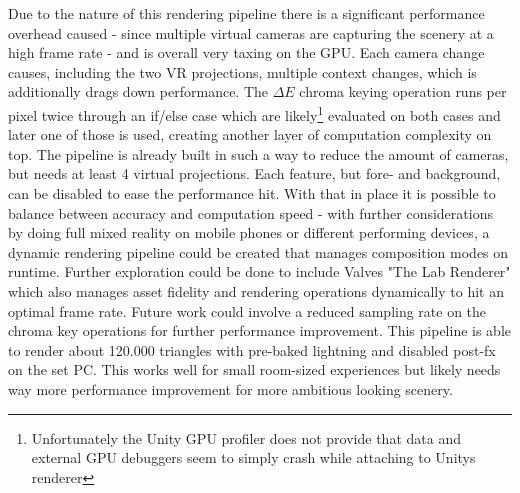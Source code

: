 Due to the nature of this rendering pipeline there is a significant performance 
overhead caused - since multiple virtual cameras are capturing the scenery at a 
high frame rate - and is overall very taxing on the GPU. Each camera change 
causes, including the two VR projections, multiple context changes, which is 
additionally drags down performance. The $\Delta E$ chroma keying operation 
runs per pixel twice through an if/else case which are 
likely\footnote{Unfortunately the Unity GPU profiler does not provide that 
data and external GPU debuggers seem to simply crash while attaching to Unitys 
renderer} evaluated on both cases and later one of those is used, creating 
another layer of computation complexity on top. 
\newline
The pipeline is already built in such a way to reduce the amount of cameras, 
but needs at least 4 virtual projections. Each feature, but fore- and 
background, can be disabled to ease the performance hit. With that in place it 
is possible to balance between accuracy and computation speed - with further 
considerations by doing full mixed reality on mobile phones or different 
performing devices, a dynamic rendering pipeline could be created that manages 
composition modes on runtime. Further exploration could be done to include 
Valves "The Lab Renderer" which also manages asset fidelity and rendering 
operations dynamically to hit an optimal frame rate. Future work could involve 
a reduced sampling rate on the chroma key operations for further performance 
improvement.
\newline
This pipeline is able to render about 120.000 triangles with pre-baked 
lightning and disabled post-fx on the set PC. This works well for small 
room-sized experiences but likely needs way more performance improvement for 
more ambitious looking scenery.